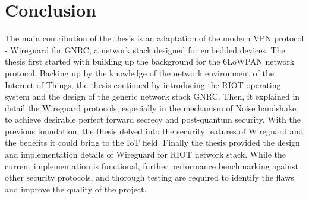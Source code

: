 \chapter{Conclusion}
  The main contribution of the thesis is an adaptation of the modern VPN protocol - Wireguard
  for GNRC, a network stack designed for embedded devices. The thesis first started
  with building up the background for the 6LoWPAN network protocol. Backing up by the
  knowledge of the network environment of the Internet of Things, the thesis continued by introducing
  the RIOT operating system and the design of the generic network stack GNRC. Then, it explained
  in detail the Wireguard protocols, especially in the mechanism of Noise handshake to 
  achieve desirable perfect forward secrecy and post-quantum security. With the previous foundation, 
  the thesis delved into the security features of Wireguard and the benefits it could bring to 
  the IoT field. Finally the thesis provided the design and implementation details of
  Wireguard for RIOT network stack. While the current implementation is functional, further
  performance benchmarking against other security protocols, and thorough testing are 
  required to identify the flaws and improve the quality of the project.